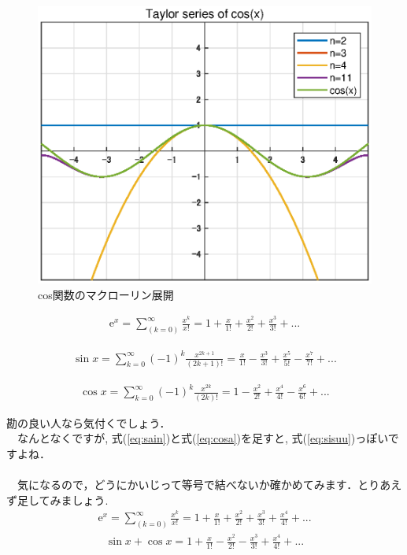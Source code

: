 \documentclass[11pt,a4paper]{ujreport} 	%
\begin{document}
\begin{figure}[H]
\label{im:cosine}
  \centering
  \includegraphics[width=12cm]{../figures/cosine.eps}
  \caption{cos関数のマクローリン展開}
\end{figure}

\begin{eqnarray}
\mathrm{e}^x = \sum_{(k=0)}^\infty \frac{x^k}{x!} = 1 + \frac{x}{1!} + \frac{x^2}{2!} + \frac{x^3}{3!} + ...
\label{eq:sisuu}
\end{eqnarray}

\begin{eqnarray}
\sin x = \sum_{k=0}^{\infty}(-1)^k \frac{x^{2k + 1}}{(2k + 1)!} = \frac{x}{1!} - \frac{x^3}{3!} + \frac{x^5}{5!} - \frac{x^7}{7!} +  ...
\label{eq:sain}
\end{eqnarray}

\begin{eqnarray}
\cos x = \sum_{k=0}^\infty(-1)^k \frac{x^{2k}}{(2k)!} = 1 - \frac{x^2}{2!} + \frac{x^4}{4!} - \frac{x^6}{6!} + ...
\label{eq:cosa}
\end{eqnarray}

勘の良い人なら気付くでしょう．\\
　なんとなくですが, 式(\ref{eq:sain})と式(\ref{eq:cosa})を足すと, 式(\ref{eq:sisuu})っぽいですよね．\\
\\
　気になるので，どうにかいじって等号で結べないか確かめてみます．とりあえず足してみましょう.
\\
\begin{eqnarray}
\mathrm{e}^x = \sum_{(k=0)}^\infty \frac{x^k}{x!} = 1 + \frac{x}{1!} + \frac{x^2}{2!} + \frac{x^3}{3!} + \frac{x^4}{4!} + ...
\end{eqnarray}
\begin{eqnarray}
\sin x + \cos x = 1 + \frac{x}{1!} - \frac{x^2}{2!} - \frac{x^3}{3!} + \frac{x^4}{4!} + ...
\label{eq:mix}
\end{eqnarray}
\end{document}
